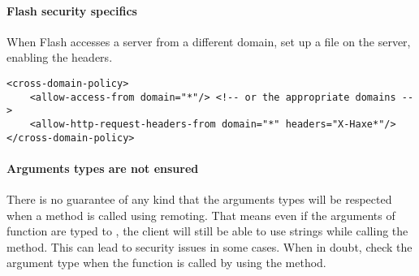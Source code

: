 \paragraph{Flash security specifics}

When Flash accesses a server from a different domain, set up a  file on the server, enabling the  headers.

\begin{lstlisting} 
<cross-domain-policy>
	<allow-access-from domain="*"/> <!-- or the appropriate domains -->
	<allow-http-request-headers-from domain="*" headers="X-Haxe*"/>
</cross-domain-policy>
\end{lstlisting} 

\paragraph{Arguments types are not ensured}

There is no guarantee of any kind that the arguments types will be respected when a method is called using remoting. 
That means even if the arguments of function  are typed to , the client will still be able to use strings while calling the method. 
This can lead to security issues in some cases. When in doubt, check the argument type when the function is called by using the  method.
